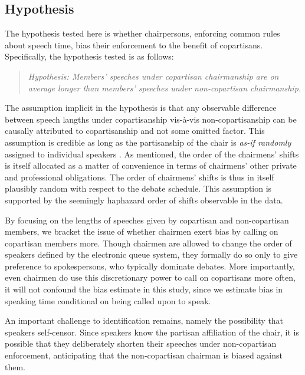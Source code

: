 \documentclass[12pt,a4paper]{article}
\begin{document}
\subsection{Hypothesis}
The hypothesis tested here is whether chairpersons, enforcing common rules about speech time, bias their enforcement to the benefit of copartisans. Specifically, the hypothesis tested is as follows:

\begin{quote}
\textit{Hypothesis: Members' speeches under copartisan chairmanship are on average longer than members' speeches under non-copartisan chairmanship.}
\end{quote}

The assumption implicit in the hypothesis is that any observable difference between speech langths under copartisanship vis-à-vis non-copartisanship can be causally attributed to copartisanship and not some omitted factor. This assumption is credible as long as the partisanship of the chair is \textit{as-if randomly} assigned to individual speakers \citep{Dunning2007}. As mentioned, the order of the chairmens' shifts is itself allocated as a matter of convenience in terms of chairmens' other private and professional obligations. The order of chairmens' shifts is thus in itself plausibly random with respect to the debate schedule. This assumption is supported by the seemingly haphazard order of shifts observable in the data.

By focusing on the lengths of speeches given by copartisan and non-copartisan members, we bracket the issue of whether chairmen exert bias by calling on copartisan members more. Though chairmen are allowed to change the order of speakers defined by the electronic queue system, they formally do so only to give preference to spokespersons, who typically dominate debates. More importantly, even chairmen do use this discretionary power to call on copartisans more often, it will not confound the bias estimate in this study, since we estimate bias in speaking time conditional on being called upon to speak.

An important challenge to identification remains, namely the possibility that speakers self-censor. Since speakers know the partisan affiliation of the chair, it is possible that they deliberately shorten their speeches under non-copartisan enforcement, anticipating that the non-copartisan chairman is biased against them.
\end{document}
